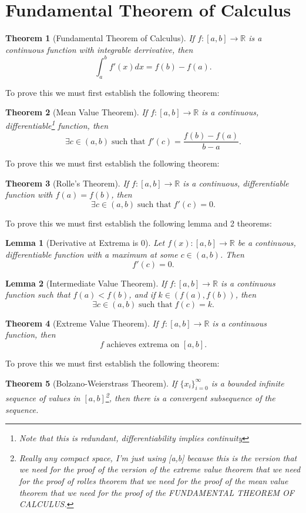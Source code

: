 \documentclass{article}[11pt]
\DeclareMathOperator{\st}{\text{ such that }}
\newtheorem{lemma}{Lemma}
\newtheorem{theorem}{Theorem}
\begin{document}
\section{Fundamental Theorem of Calculus}
\begin{theorem}[Fundamental Theorem of Calculus]
	\label{thm:FTC}
	If $f : [a, b] \to \mathbb{R}$ is a continuous function with integrable derrivative, then 
	$$\int_{a}^{b} f'(x) dx = f(b) - f(a).$$
\end{theorem}
To prove this we must first establish the following theorem:
\begin{theorem}[Mean Value Theorem]
	\label{thm:MVT}
	If $f : [a, b] \to \mathbb{R}$ is a continuous, differentiable\footnote{Note that this is redundant, differentiability implies continuity} function, then 
	$$\exists c\in (a, b) \st f'(c) = \frac{f(b) - f(a)}{b - a}.$$
\end{theorem}
To prove this we must first establish the following theorem:
\begin{theorem}[Rolle's Theorem]
	\label{thm:rolle}
	If $f : [a, b] \to \mathbb{R}$ is a continuous, differentiable function with $f(a) = f(b)$, then 
	$$\exists c\in (a, b) \st f'(c) = 0.$$
\end{theorem}
To prove this we must first establish the following lemma and 2 theorems:
\begin{lemma}[Derivative at Extrema is $0$]
	\label{lem:derivAtExtrema}
	Let $f(x) : [a,b] \to \mathbb{R}$	be a continuous, differentiable function with a maximum at some $c\in (a,b)$. Then 
	$$f'(c) = 0.$$
\end{lemma}
\begin{lemma}[Intermediate Value Theorem]
	\label{lem:IVT}
	If $f : [a,b] \to \mathbb{R}$ is a continuous function such that $f(a) < f(b)$, and if $k \in (f(a), f(b))$, then 
	$$\exists c\in (a, b) \st f(c) = k.$$
\end{lemma}
\begin{theorem}[Extreme Value Theorem]
	\label{thm:extremeValue}
	If $f: [a,b] \to \mathbb{R}$ is a continuous function, then 
	$$f \text{ achieves extrema on } [a, b].$$
\end{theorem}
To prove this we must first establish the following theorem: 
\begin{theorem}[Bolzano-Weierstrass Theorem]
	\label{thm:bolzanoWeierstrass}
	If $\{x_i\}_{i=0}^\infty$ is a bounded infinite sequence of values in $[a,b]$\footnote{Really any compact space, I'm just using [a,b] because this is the version that we need for the proof of the version of the extreme value theorem that we need for the proof of rolles theorem that we need for the proof of the mean value theorem that we need for the proof of the FUNDAMENTAL THEOREM OF CALCULUS.}, then there is  a convergent subsequence of the sequence.
\end{theorem}
\end{document}
